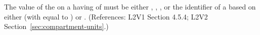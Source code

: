 The value of the   on a \Compartment having
 of  must be either ,
, , or the identifier of a
\UnitDefinition based on either  (with  equal
to ) or .  (References: L2V1 Section 4.5.4;
L2V2 Section~\ref{sec:compartment-units}.)
